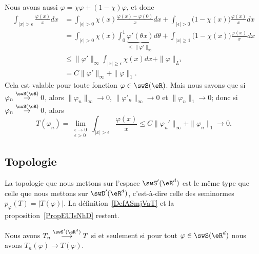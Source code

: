 \begin{example}
    Nous avons aussi \( \varphi=\chi\varphi+(1-\chi)\varphi\), et donc
    \begin{subequations}
        \begin{align}
            \int_{| x |>\epsilon}\frac{ \varphi(x) }{ x }dx&=\int_{| \epsilon |>0}\chi(x)\frac{ \varphi(x)-\varphi(0) }{ x }dx+\int_{| \epsilon |>0}\big( 1-\chi(x) \big)\frac{ \varphi(x) }{ x }dx\\
            &=\int_{| \epsilon |>0}\chi(x)\int_0^1\underbrace{\varphi'(\theta x)}_{\leq \| \varphi' \|_{\infty}}d\theta+\int_{| x |\geq 1}\big( 1-\chi(x) \big)\frac{ \varphi(x) }{ x }dx\\
            &\leq\| \varphi' \|_{\infty}\int_{| x |\geq \epsilon}\chi(x)dx+\| \varphi \|_{L^1}\\
            &=C\| \varphi' \|_{\infty}+\| \varphi \|_{1}.
        \end{align}
    \end{subequations}
    Cela est valable pour toute fonction \( \varphi\in\swS(\eR)\). Mais nous savons que si \( \varphi_n\stackrel{\swS(\eR)}{\to}0\), alors \( \| \varphi_n \|_{\infty}\to 0\), \( \| \varphi'_n \|_{\infty}\to 0\) et \( \| \varphi_n \|_1\to 0\); donc si \( \varphi_n\stackrel{\swS(\eR)}{\to}0\), alors
    \begin{equation}
        T(\varphi_n)=\lim_{\substack{\epsilon\to 0\\\epsilon>0}}\int_{| x |>\epsilon}\frac{ \varphi(x) }{ x }\leq C\| \varphi_n' \|_{\infty}+\| \varphi_n \|_1\to 0.
    \end{equation}
\end{example}

\subsection{Topologie}

La topologie que nous mettons sur l'espace \( \swS'(\eR^d)\) est le même type que celle que nous mettons sur \( \swD'(\eR^d)\), c'est-à-dire celle des seminormes \( p_{\varphi}(T)=| T(\varphi) |\). La définition~\ref{DefASmjVaT} et la proposition~\ref{PropEUIsNhD} restent.

\begin{proposition} \label{PropQAuJstI}
    Nous avons \( T_n\stackrel{\swS'(\eR^d)}{\longrightarrow}T\) si et seulement si pour tout \( \varphi\in\swS(\eR^d)\) nous avons \( T_n(\varphi)\to T(\varphi)\).
\end{proposition}

